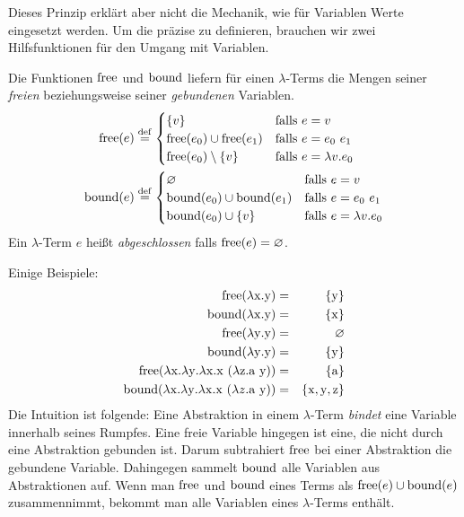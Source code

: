 Dieses Prinzip erklärt aber nicht die Mechanik, wie für Variablen
Werte eingesetzt werden.  Um die präzise zu definieren, brauchen wir
zwei Hilfsfunktionen für den Umgang mit Variablen.
%
\begin{definition}
  Die Funktionen $\operatorname{free}$ und $\operatorname{bound}$ liefern für einen
  $\lambda$-Terms die Mengen seiner \emph{freien} beziehungsweise seiner
  \emph{gebundenen} Variablen.  %
  \begin{align*}
    \operatorname{free}(e) & \stackrel{\rm def}{=}
    \begin{cases}
      \{ v \}  & \text{falls } e  = v\\
      \operatorname{free}(e_0) \cup \operatorname{free}(e_1) & \text{falls } e = e_0~e_1\\
      \operatorname{free}(e_0) \setminus \{v\} & \text{falls } e = \lambda v.e_0
    \end{cases}\\
    \operatorname{bound}(e) & \stackrel{\rm def}{=}
    \begin{cases}
      \varnothing & \text{falls } e = v\\
      \operatorname{bound}(e_0) \cup \operatorname{bound}(e_1) & \text{falls } e = e_0~e_1\\
      \operatorname{bound}(e_0) \cup \{v\} & \text{falls } e = \lambda v.e_0
    \end{cases}
  \end{align*}
  Ein
  $\lambda$-Term $e$ heißt \emph{abgeschlossen}
  falls $\operatorname{free}(e)=\varnothing$.
\end{definition}
%
Einige Beispiele:
%
\begin{eqnarray*}
  \operatorname{free}(\lambda \mathrm x.\mathrm y) &=& \{\mathrm y\}\\
  \operatorname{bound}(\lambda \mathrm x.\mathrm y) &=& \{\mathrm x\}\\
  \operatorname{free}(\lambda \mathrm y.\mathrm y) &=& \varnothing\\
  \operatorname{bound}(\lambda \mathrm y.\mathrm y) &=& \{\mathrm y\}\\
  \operatorname{free}(\lambda \mathrm x.\lambda \mathrm y.\lambda \mathrm x.\mathrm x~(\lambda \mathrm z.\mathrm a~\mathrm y)) &=& \{ \mathrm a\}\\
  \operatorname{bound}(\lambda \mathrm x.\lambda \mathrm y.\lambda \mathrm x.\mathrm x~(\lambda z.\mathrm a~\mathrm y)) &=& \{ \mathrm x,\mathrm y,\mathrm z\}
\end{eqnarray*}
%
Die Intuition ist folgende: Eine Abstraktion in einem $\lambda$-Term
\emph{bindet} eine Variable innerhalb seines Rumpfes.  Eine freie
Variable hingegen ist eine, die nicht durch eine Abstraktion gebunden
ist.  Darum subtrahiert $\operatorname{free}$ bei einer Abstraktion die gebundene
Variable.  Dahingegen sammelt $\operatorname{bound}$ alle Variablen aus
Abstraktionen auf.  Wenn man $\operatorname{free}$ und $\operatorname{bound}$ eines Terms als
$\operatorname{free}(e)\cup\operatorname{bound}(e)$ zusammennimmt, bekommt man alle Variablen
eines $\lambda$-Terms enthält.

